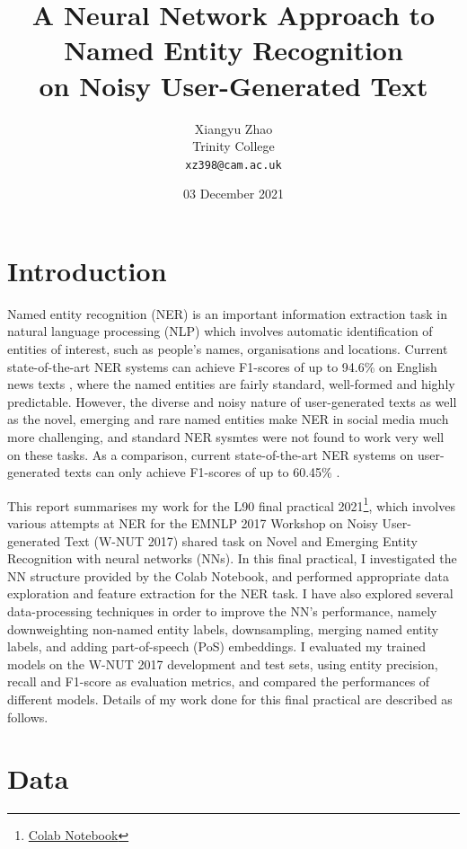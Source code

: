 \documentclass[11pt,a4paper]{article}
\title{A Neural Network Approach to Named Entity Recognition \\ on Noisy User-Generated Text}
\author{Xiangyu Zhao \\
    Trinity College \\
    \texttt{xz398@cam.ac.uk} \\}
\date{03 December 2021}
\begin{document}
\maketitle

\section{Introduction}

Named entity recognition (NER) is an important information extraction task in natural language processing (NLP) which involves automatic identification of entities of interest, such as people's names, organisations and locations. Current state-of-the-art NER systems can achieve F1-scores of up to 94.6\% on English news texts \citep{wang-etal-2021-automated}, where the named entities are fairly standard, well-formed and highly predictable. However, the diverse and noisy nature of user-generated texts as well as the novel, emerging and rare named entities make NER in social media much more challenging, and standard NER sysmtes were not found to work very well on these tasks. As a comparison, current state-of-the-art NER systems on user-generated texts can only achieve F1-scores of up to 60.45\% \citep{wang-etal-2021-improving}.

This report summarises my work for the L90 final practical 2021\footnote{\href{https://colab.research.google.com/drive/1Jw437OCJ-UQskMZJnLFQlTYNNH-rX4PA?usp=sharing}{Colab Notebook}}, which involves various attempts at NER for the EMNLP 2017 Workshop on Noisy User-generated Text (W-NUT 2017) shared task on Novel and Emerging Entity Recognition \citep{derczynski-etal-2017-results} with neural networks (NNs). In this final practical, I investigated the NN structure provided by the Colab Notebook, and performed appropriate data exploration and feature extraction for the NER task. I have also explored several data-processing techniques in order to improve the NN's performance, namely downweighting non-named entity labels, downsampling, merging named entity labels, and adding part-of-speech (PoS) embeddings. I evaluated my trained models on the W-NUT 2017 development and test sets, using entity precision, recall and F1-score as evaluation metrics, and compared the performances of different models. Details of my work done for this final practical are described as follows.

\section{Data}
\end{document}
